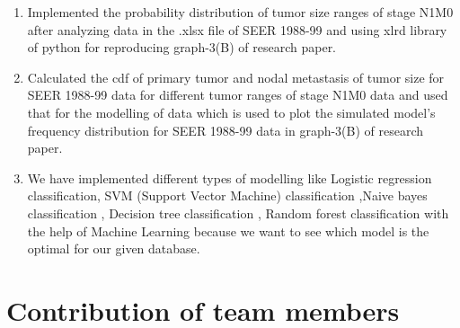 \documentclass{article}
\begin{document}
\begin{enumerate}
		\item Implemented the probability distribution of tumor size ranges of stage N1M0 after analyzing data in the .xlsx file of SEER 1988-99 and using xlrd library of python for reproducing graph-3(B) of research paper.
		
		\item Calculated the cdf of primary tumor and nodal metastasis of tumor size for SEER 1988-99 data for different tumor ranges of stage N1M0 data and used that for the modelling of data which is used to plot the simulated model’s  frequency distribution for SEER 1988-99 data in graph-3(B) of research paper.
		
		\item We have implemented different types of modelling like Logistic regression classification, SVM (Support Vector Machine) classification ,Naive bayes classification , Decision tree classification , Random forest classification with the help of Machine Learning because we want to see which model is the optimal for our given database.
		
	\end{enumerate}
	\pagebreak
	
	
	\section{Contribution of team members}	
\end{document}
